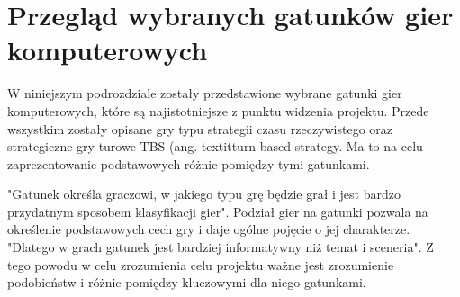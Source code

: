 \section{Przegląd wybranych gatunków gier komputerowych}
W niniejszym podrozdziale zostały przedstawione wybrane gatunki gier komputerowych, które są najistotniejsze z punktu widzenia
projektu. Przede wszystkim zostały opisane gry typu strategii czasu rzeczywistego oraz strategiczne gry turowe TBS (ang.
textit{turn-based strategy}. Ma to na celu zaprezentowanie podstawowych różnic pomiędzy tymi gatunkami.

"Gatunek określa graczowi, w jakiego typu grę będzie grał i jest bardzo przydatnym sposobem klasyfikacji gier"\cite{understanding_games}.
Podział gier na gatunki pozwala na określenie podstawowych cech gry i daje ogólne pojęcie o jej charakterze. "Dlatego w
grach gatunek jest bardziej informatywny niż temat i sceneria"\cite{practical_game_design}. Z tego powodu w celu
zrozumienia celu projektu ważne jest zrozumienie podobieństw i różnic pomiędzy kluczowymi dla niego gatunkami.





